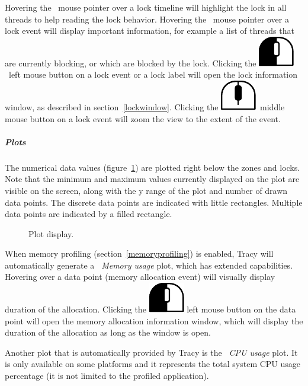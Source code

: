 \documentclass[hidelinks,titlepage,a4paper]{article}
\newcommand{\LMB}{\includegraphics[height=.8\baselineskip]{icons/lmb}}
\newcommand{\MMB}{\includegraphics[height=.8\baselineskip]{icons/mmb}}
\begin{document}
Hovering the \faMousePointer{}~mouse pointer over a lock timeline will highlight the lock in all threads to help reading the lock behavior. Hovering the \faMousePointer{}~mouse pointer over a lock event will display important information, for example a list of threads that are currently blocking, or which are blocked by the lock. Clicking the \LMB{}~left mouse button on a lock event or a lock label will open the lock information window, as described in section~\ref{lockwindow}. Clicking the \MMB{}~middle mouse button on a lock event will zoom the view to the extent of the event.

\subparagraph{Plots}
\label{plots}

The numerical data values (figure~\ref{plot}) are plotted right below the zones and locks. Note that the minimum and maximum values currently displayed on the plot are visible on the screen, along with the y range of the plot and number of drawn data points. The discrete data points are indicated with little rectangles. Multiple data points are indicated by a filled rectangle.

\begin{figure}[h]
\centering{}
\caption{Plot display.}
\label{plot}
\end{figure}

When memory profiling (section~\ref{memoryprofiling}) is enabled, Tracy will automatically generate a \emph{\faMemory{}~Memory usage} plot, which has extended capabilities. Hovering over a data point (memory allocation event) will visually display duration of the allocation. Clicking the \LMB{} left mouse button on the data point will open the memory allocation information window, which will display the duration of the allocation as long as the window is open.

Another plot that is automatically provided by Tracy is the \emph{\faTachometer*{}~CPU usage} plot. It is only available on some platforms and it represents the total system CPU usage percentage (it is not limited to the profiled application).
\end{document}
